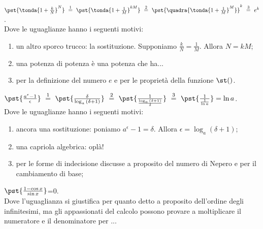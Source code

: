 \begin{esempio}
\(\pst{\tonda{1+\frac{k}{N}}^N}
~ \stackrel{1}{=} ~  
\pst{\tonda{1+\frac{1}{M}}^{kM}}
~ \stackrel{2}{=} ~
\pst{\quadra{\tonda{1+\frac{1}{M}}^M}}^k
~ \stackrel{3}{=} ~ e^k\).\\

Dove le uguaglianze hanno i seguenti motivi:
\begin{enumerate} [nosep]
 \item un altro sporco trucco: la sostituzione. Supponiamo
$\frac{k}{N}=\frac{1}{M}$. Allora $N=kM$;
 \item una potenza di potenza è una potenza che ha...
 \item per la definizione del numero $e$ e per le proprietà della funzione $\st()$.
\end{enumerate}
\end{esempio}

\begin{esempio}
\(\pst{\frac{a^\epsilon-1}{\epsilon}}
~ \stackrel{1}{=} ~  
\pst{\frac{\delta}{\log_a{(\delta+1)}}}
~ \stackrel{2}{=} ~
\pst{\frac{1}{\frac{\log_a{(\delta+1)}}{\delta}}}
~ \stackrel{3}{=} ~ 
\pst{\frac{1}{\frac{1}{\ln{a}}}}=\ln{a}\).\\

Dove le uguaglianze hanno i seguenti motivi:
\begin{enumerate} [nosep]
 \item ancora una sostituzione: poniamo
$a^\epsilon-1=\delta$. Allora $\epsilon=\log_a(\delta+1)$;
 \item una capriola algebrica: oplà! 
 \item per le forme di indecisione discusse a proposito del numero di Nepero
e per il cambiamento di base;
\end{enumerate}
\end{esempio}

\begin{esempio}
 \(\pst{\frac{1-\cos x}{\sin x}}\)=0.\\

Dove l'uguaglianza si giustifica per quanto detto a proposito dell'ordine 
degli infinitesimi, ma gli appassionati del calcolo possono provare a moltiplicare
il numeratore e il denominatore per ...
\end{esempio}


